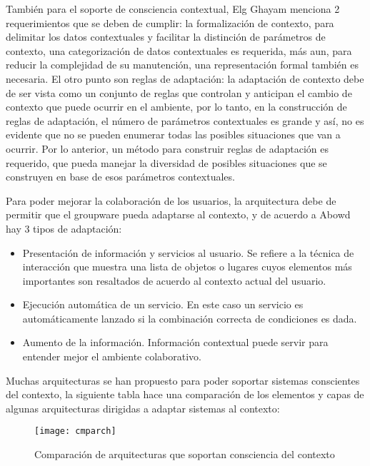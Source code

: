 Tambi\'en para el soporte de consciencia contextual, Elg Ghayam \cite{el2011distributed} menciona 2 requerimientos que se deben de cumplir: la formalizaci\'on de contexto, para delimitar los datos contextuales y facilitar la distinci\'on de par\'ametros de contexto, una categorizaci\'on de datos contextuales es requerida, m\'as aun, para reducir la complejidad de su manutenci\'on, una representaci\'on formal tambi\'en es necesaria. El otro punto son reglas de adaptaci\'on: la adaptaci\'on de contexto debe de ser vista como un conjunto de reglas que controlan y anticipan el cambio de contexto que puede ocurrir en el ambiente, por lo tanto, en la construcci\'on de reglas de adaptaci\'on, el n\'umero de par\'ametros contextuales es grande y as\'i, no es evidente que no se pueden enumerar todas las posibles situaciones que van a ocurrir. Por lo anterior, un m\'etodo para construir reglas de adaptaci\'on es requerido, que pueda manejar la diversidad de posibles situaciones que se construyen en base de esos par\'ametros contextuales.

Para poder mejorar la colaboraci\'on de los usuarios, la arquitectura debe de permitir que el groupware pueda adaptarse al contexto, y de acuerdo a Abowd\cite{abowd1999towards} hay 3 tipos de adaptaci\'on:
\begin{itemize}
\item  Presentaci\'on de informaci\'on y servicios al usuario. Se refiere a la t\'ecnica de interacci\'on que muestra una lista de objetos o lugares cuyos elementos m\'as importantes son resaltados de acuerdo al contexto actual del usuario.
\item Ejecuci\'on autom\'atica de un servicio. En este caso un servicio es autom\'aticamente lanzado si la combinaci\'on correcta de condiciones es dada.
\item Aumento de la informaci\'on. Informaci\'on contextual puede servir para entender mejor el ambiente colaborativo.
\end{itemize}

Muchas arquitecturas se han propuesto para poder soportar sistemas conscientes del contexto, la siguiente tabla hace una comparaci\'on de los elementos y capas de algunas arquitecturas dirigidas a adaptar sistemas al contexto:

\begin{figure}[h!]
  \centering
    \texttt{[image: cmparch]}
  \caption{Comparaci\'on de arquitecturas que soportan consciencia del contexto\cite{montane2013context}\cite{dey1999architecture}\cite{kamoun2012fadyrcos}\cite{decouchant2013adapting}\cite{guermah2013ontology}}
\end{figure}

